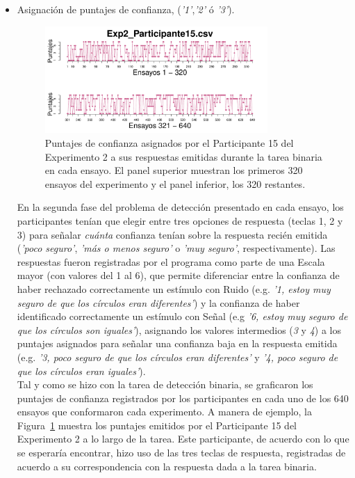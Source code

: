 \begin{itemize}
	\item Asignación de puntajes de confianza, (\textit{'1'},\textit{'2'} ó \textit{'3'}).

\begin{figure}[h]
\centering
\includegraphics[width=0.80\textwidth]{Figures/Rating_Exp2_P15} 
\decoRule
\caption[Explorando datos individuales (ejemplo): Puntaje de confianza emitido por cada ensayo]{Puntajes de confianza asignados por el Participante 15 del Experimento 2 a sus respuestas emitidas durante la tarea binaria en cada ensayo. El panel superior muestran los primeros 320 ensayos del experimento y el panel inferior, los 320 restantes.}
\label{fig:Rating_E2_P4}
\end{figure}


En la segunda fase del problema de detección presentado en cada ensayo, los participantes tenían que elegir entre tres opciones de respuesta (teclas 1, 2 y 3) para señalar \textit{cuánta} confianza tenían sobre la respuesta recién emitida (\textit{'poco seguro'}, \textit{'más o menos seguro'} o \textit{'muy seguro'}, respectivamente). Las respuestas fueron registradas por el programa como parte de una Escala mayor (con valores del 1 al 6), que permite diferenciar entre la confianza de haber rechazado correctamente un estímulo con Ruido (e.g. \textit{'1, estoy muy seguro de que los círculos eran diferentes'}) y la confianza de haber identificado correctamente un estímulo con Señal (e.g \textit{'6, estoy muy seguro de que los círculos son iguales'}), asignando los valores intermedios (\textit{3} y \textit{4}) a los puntajes asignados para señalar una confianza baja en la respuesta emitida (e.g. \textit{'3, poco seguro de que los círculos eran diferentes'} y \textit{'4, poco seguro de que los círculos eran iguales'}).\\

Tal y como se hizo con la tarea de detección binaria, se graficaron los puntajes de confianza registrados por los participantes en cada uno de los 640 ensayos que conformaron cada experimento. A manera de ejemplo, la Figura~\ref{fig:Rating_E2_P4} muestra los puntajes emitidos por el Participante 15 del Experimento 2 a lo largo de la tarea. Este participante, de acuerdo con lo que se esperaría encontrar, hizo uso de las tres teclas de respuesta, registradas de acuerdo a su correspondencia con la respuesta dada a la tarea binaria.\\ 
 

\end{itemize}
